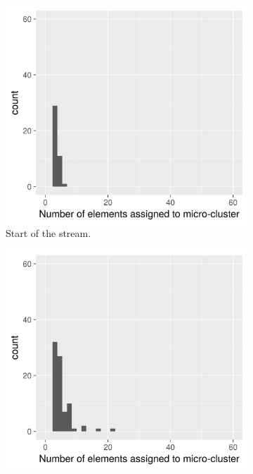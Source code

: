 \begin{figure}[h!]
  \centering
  \begin{subfigure}{0.32\textwidth}
    \centering
    \includegraphics[width = \textwidth]{microcluster_histograms/s_set_1_hist_t_501.png}
    \caption{Start of the stream.}
  \label{fig:hist1}
  \end{subfigure}
  \begin{subfigure}{0.32\textwidth}
    \centering
    \includegraphics[width = \textwidth]{microcluster_histograms/s_set_1_hist_t_1250.png}

\end{subfigure}
\end{figure}
